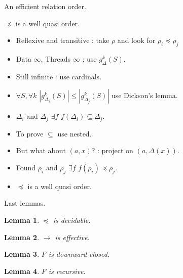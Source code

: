 \documentclass{beamer}
\newtheorem{lm}{Lemma}[thr]
\begin{document}
\begin{frame}{An efficient relation order. }
\end{frame}

\begin{frame}{$\preceq$ is a well quasi order.}
 \begin{itemize}
  \pause
  \item Reflexive and transitive \pause : take $\rho$ and look for $\rho_i \preceq \rho_j$ \pause
  \item Data $\infty$, Threads $\infty$ \pause : use $g^k_{\Delta}(S)$.  \pause
  \item Still infinite \pause : use cardinals. \pause
  \item $\forall S, \forall k $  $|g^k_{\Delta_i}(S)| \leq  |g^k_{\Delta_j}(S)|$ use Dickson's lemma. \pause
  \item $\Delta_i$ and $\Delta_j$ \pause $\exists f $ $f(\Delta_i) \subseteq \Delta_j$. \pause 
  \item To prove $\subseteq$ use nested. \pause
  \item But what about $(a,x)$? \pause : project on $(a,\Delta(x))$. \pause
  \item Found $\rho_i$ and $\rho_j$ \pause $\exists f $ $f(\rho_i) \preceq \rho_j$. \pause 
  \item $\preceq$ is a well quasi order.
 \end{itemize}

\end{frame}

\begin{frame}{Last lemmas.}

\begin{lm} 
  $\preceq$ is decidable.
\end{lm}
\pause
\begin{lm} 
  $\rightarrow$ is effective.
\end{lm}
\pause
\begin{lm} 
  $F$ is downward closed. 
\end{lm}
\pause
\begin{lm} 
  $F$ is recursive.
\end{lm}

\end{frame}
\end{document}

